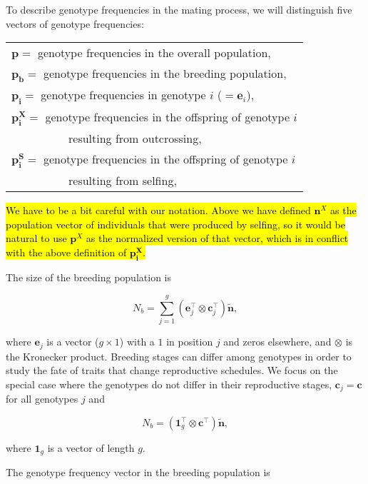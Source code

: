 \documentclass[11pt]{article}
\def\mbf#1{\mathbf{#1}}
\begin{document}
To describe genotype frequencies in the mating process, we will distinguish five vectors of genotype frequencies:

\begin{table}[htbp]
\centering
\begin{tabular}{ l } 
	$\mbf{p} =$ genotype frequencies in the overall population, \\
	$\mbf{p_b} =$ genotype frequencies in the breeding population, \\
	$\mbf{p_i} =$ genotype frequencies in genotype $i$ ($=\mbf{e}_i$), \\
	$\mbf{p^X_i} =$ genotype frequencies in the offspring of genotype $i$ \\
	~~~~~~~~~~resulting from outcrossing, \\
	$\mbf{p^S_i} =$ genotype frequencies in the offspring of genotype $i$ \\
	~~~~~~~~~~resulting from selfing,\\
\end{tabular}
\end{table}

\hl{We have to be a bit careful with our notation. Above we have defined $\mathbf{n}^X$ as the population vector of individuals that were produced by selfing, so it would be natural to use $\mathbf{p}^X$ as the normalized version of that vector, which is in conflict with the above definition of $\mbf{p^X_i} $.}

The size of the breeding population is

\begin{equation}
	N_b = \sum_{j=1}^g (\mbf{e}_j^\intercal \otimes \mbf{c}_j^\intercal) \tilde{\mbf{n}},
\end{equation}

\noindent where $\mbf{e}_j$ is a vector ($g \times 1$) with a $1$ in position $j$ and zeros elsewhere, and $\otimes$ is the Kronecker product. Breeding stages can differ among genotypes in order to study the fate of traits that change reproductive schedules. We focus on the special case where the genotypes do not differ in their reproductive stages, $\mbf{c}_j = \mbf{c}$ for all genotypes $j$ and

\begin{equation}
	N_b = (\mbf{1}_g^\intercal \otimes \mbf{c}^\intercal) \tilde{\mbf{n}},
\end{equation}

\noindent where $\mbf{1}_g$ is a vector of length $g$.

The genotype frequency vector in the breeding population is 
\end{document}
